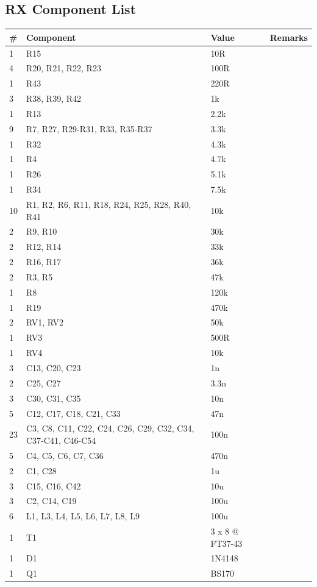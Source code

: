 \documentclass[10pt, a4paper,twoside]{scrartcl}
\begin{document}
\subsection{RX Component List}  \label{sec:rxcomp}
\begin{longtable}{|l|p{6cm}|l|l|} \hline 
\# & Component & Value & Remarks \\ \hline 
1 & R15 & 10R & \\
4 & R20, R21, R22, R23 & 100R & \\
1 & R43 & 220R & \\
3 & R38, R39, R42 & 1k & \\
1 & R13 & 2.2k & \\
9 & R7, R27, R29-R31, R33, R35-R37 & 3.3k & \\
1 & R32 & 4.3k & \\
1 & R4 & 4.7k & \\
1 & R26 & 5.1k & \\
1 & R34 & 7.5k & \\
10 & R1, R2, R6, R11, R18, R24, R25, R28, R40, R41 & 10k & \\
2 & R9, R10 & 30k & \\
2 & R12, R14 & 33k & \\
2 & R16, R17 & 36k & \\
2 & R3, R5 & 47k & \\
1 & R8 & 120k & \\
1 & R19 & 470k & \\
2 & RV1, RV2 & 50k & \\
1 & RV3 & 500R & \\
1 & RV4 & 10k & \\
3 & C13, C20, C23 & 1n & \\
2 & C25, C27 & 3.3n & \\
3 & C30, C31, C35 & 10n & \\
5 & C12, C17, C18, C21, C33 & 47n & \\
23 & C3, C8, C11, C22, C24, C26, C29, C32, C34, C37-C41, C46-C54 & 100n & \\
5 & C4, C5, C6, C7, C36 & 470n & \\
2 & C1, C28 & 1u & \\
3 & C15, C16, C42 & 10u & \\
3 & C2, C14, C19 & 100u & \\
6 & L1, L3, L4, L5, L6, L7, L8, L9 & 100u & \\
1 & T1 & 3 x 8 @ FT37-43 & \\
1 & D1 & 1N4148 & \\
1 & Q1 & BS170 & \\

\end{longtable}
\end{document}
